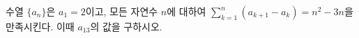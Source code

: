 \hspace*{2mm}\begin{minipage}[t]{\dimexpr\linewidth-2mm\relax}\vspace{0pt}
수열 $\{a_n\}$은 $a_1=2$이고, 모든 자연수 $n$에 대하여 $\displaystyle\sum_{k=1}^{n}(a_{k+1}-a_k)=n^2-3n$을 만족시킨다. 이때 $a_{13}$의 값을 구하시오.\end{minipage}
